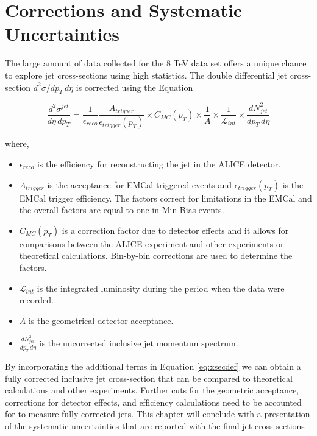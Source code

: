 \chapter{Corrections and Systematic Uncertainties} \label{ch:error}

The large amount of data collected for the 8 TeV data set offers a unique chance to explore jet cross-sections using high statistics.   The double differential jet cross-section $d^{2}\sigma/dp_{T} \, d\eta$ is corrected using the Equation

\begin{equation}
	\frac{d^{2} \sigma^{jet}}{d\eta \, dp_{T}} = \frac{1}{\epsilon_{reco}} \frac{A_{trigger}}{\epsilon_{trigger}(p_{T})} \times C_{MC} (p_{T}) \times \frac{1}{A} \times \frac{1}{\mathscr{L}_{int}} \times \frac{dN^{2}_{jet}}{dp_{T} \, d\eta}
\label{eq:xsecdef}
\end{equation}

\noindent
where,

\begin{itemize}
  \item $\epsilon_{reco}$ is the efficiency for reconstructing the jet in the ALICE detector.
  \item $A_{trigger}$ is the acceptance for EMCal triggered events and $\epsilon_{trigger}(p_{T})$ is the EMCal trigger efficiency.  The factors correct for limitations in the EMCal and the overall factors are equal to one in Min Bias events.
  \item $C_{MC} (p_{T})$ is a correction factor due to detector effects and it allows for comparisons between the ALICE experiment and other experiments or theoretical calculations.  Bin-by-bin corrections are used to determine the factors.
  \item $\mathscr{L}_{int}$ is the integrated luminosity during the period when the data were recorded.
  \item $A$ is the geometrical detector acceptance.
  \item $\frac{dN^{2}_{jet}}{dp_{T} \, d\eta}$ is the uncorrected inclusive jet momentum spectrum.
  
\end{itemize}

By incorporating the additional terms in Equation \ref{eq:xsecdef} we can obtain a fully corrected inclusive jet cross-section that can be compared to theoretical calculations and other experiments.  Further cuts for the geometric acceptance, corrections for detector effects, and efficiency calculations need to be accounted for to measure fully corrected jets.  This chapter will conclude with a presentation of the systematic uncertainties that are reported with the final jet cross-sections

